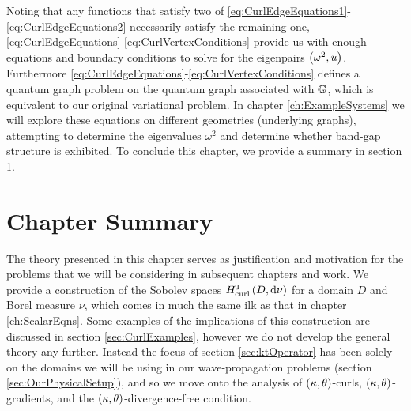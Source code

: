 Noting that any functions that satisfy two of \eqref{eq:CurlEdgeEquations1}-\eqref{eq:CurlEdgeEquations2} necessarily satisfy the remaining one, \eqref{eq:CurlEdgeEquations}-\eqref{eq:CurlVertexConditions} provide us with enough equations and boundary conditions to solve for the eigenpairs $\left( \omega^2, u \right)$.
Furthermore \eqref{eq:CurlEdgeEquations}-\eqref{eq:CurlVertexConditions} defines a quantum graph problem on the quantum graph associated with $\mathbb{G}$, which is equivalent to our original variational problem.
In chapter \ref{ch:ExampleSystems} we will explore these equations on different geometries (underlying graphs), attempting to determine the eigenvalues $\omega^2$ and determine whether band-gap structure is exhibited.
To conclude this chapter, we provide a summary in section \ref{sec:CurlSummary}.

\section{Chapter Summary} \label{sec:CurlSummary}
The theory presented in this chapter serves as justification and motivation for the problems that we will be considering in subsequent chapters and work.
We provide a construction of the Sobolev spaces $H^1_\mathrm{curl}\left( D, \mathrm{d}\nu \right)$ for a domain $D$ and Borel measure $\nu$, which comes in much the same ilk as that in chapter \ref{ch:ScalarEqns}.
Some examples of the implications of this construction are discussed in section \ref{sec:CurlExamples}, however we do not develop the general theory any further.
Instead the focus of section \ref{sec:ktOperator} has been solely on the domains we will be using in our wave-propagation problems (section \ref{sec:OurPhysicalSetup}), and so we move onto the analysis of $\left( \kappa, \theta \right)$-curls, $\left( \kappa, \theta \right)$-gradients, and the $\left( \kappa, \theta \right)$-divergence-free condition. \newline

